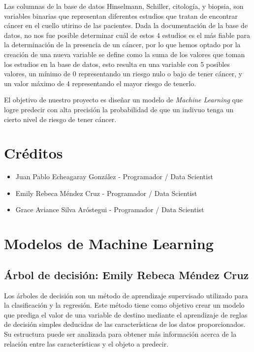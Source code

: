 \documentclass[journal]{IEEEtran}                                                          %
\begin{document}
        Las columnas de la base de datos Hinselmann, Schiller, citología, y biopsia, son variables binarias que representan diferentes estudios que tratan de encontrar cáncer en el cuello utirino de las pacientes. Dada la documentación de la base de datos, no nos fue posible determinar cuál de estos 4 estudios es el más fiable para la determinación de la presencia de un cáncer, por lo que hemos optado por la creación de una nueva variable se define como la suma de los valores que toman los estudios en la base de datos, esto resulta en una variable con 5 posibles valores, un mínimo de 0 representando un riesgo nulo o bajo de tener cáncer, y un valor máximo de 4 representando el mayor riesgo de tenerlo.

        El objetivo de nuestro proyecto es diseñar un modelo de \emph{Machine Learning} que logre predecir con alta precisión la probabilidad de que un indivuo tenga un cierto nivel de riesgo de tener cáncer.
    
    \section{Créditos} \label{credits}
       
        \begin{itemize}
            \item Juan Pablo Echeagaray González - Programador / Data Scientist
            \item Emily Rebeca Méndez Cruz - Programador / Data Scientist
            \item Grace Aviance Silva Aróstegui - Programador / Data Scientist
        \end{itemize}

    \section{Modelos de Machine Learning} \label{modelos}

        \subsection{Árbol de decisión: Emily Rebeca Méndez Cruz} \label{decision-tree}

            Los árboles de decisión son un método de aprendizaje supervisado utilizado para la clasificación y la regresión. Este método tiene como objetivo crear un modelo que prediga el valor de una variable de destino mediante el aprendizaje de reglas de decisión simples deducidas de las características de los datos proporcionados. Su estructura puede ser analizada para obtener más información acerca de la relación entre las características y el objeto a predecir.
\end{document}
